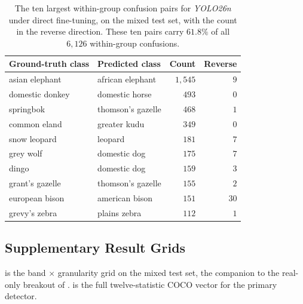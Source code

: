 \begin{table}[htbp]
\centering
\caption[Largest within-group confusion pairs]{The ten largest within-group confusion pairs for \textit{YOLO26n} under direct fine-tuning, on the mixed test set, with the count in the reverse direction. These ten pairs carry $61.8\%$ of all $6{,}126$ within-group confusions.}
\label{tab:lookalike-top-pairs}
\begin{tabular}{@{}llrr@{}}
\toprule
Ground-truth class & Predicted class & Count & Reverse \\
\midrule
asian elephant & african elephant & $1{,}545$ & $9$ \\
domestic donkey & domestic horse & $493$ & $0$ \\
springbok & thomson's gazelle & $468$ & $1$ \\
common eland & greater kudu & $349$ & $0$ \\
snow leopard & leopard & $181$ & $7$ \\
grey wolf & domestic dog & $175$ & $7$ \\
dingo & domestic dog & $159$ & $3$ \\
grant's gazelle & thomson's gazelle & $155$ & $2$ \\
european bison & american bison & $151$ & $30$ \\
grevy's zebra & plains zebra & $112$ & $1$ \\
\bottomrule
\end{tabular}
\end{table}

\subsection{Supplementary Result Grids}\label{sec:appendix_band_and_domain_grids}

 is the band $\times$ granularity grid on the mixed test set, the companion to the real-only breakout of .  is the full twelve-statistic COCO vector for the primary detector.

